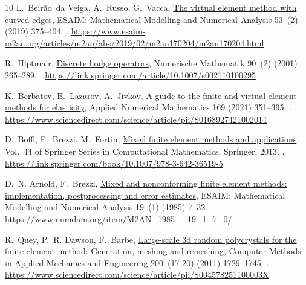 \documentclass{elsarticle}
\theoremstyle{definition}
\begin{document}
\begin{thebibliography}{10}
L.~Beir{\~a}o~da Veiga, A.~Russo, G.~Vacca,
  \href{https://www.esaim-m2an.org/articles/m2an/abs/2019/02/m2an170204/m2an170204.html}{The
  virtual element method with curved edges}, ESAIM: Mathematical Modelling and
  Numerical Analysis 53~(2) (2019) 375--404.
\newblock \href {https://doi.org/10.1051/m2an/2018052}
  {}.
\newline\urlprefix\url{https://www.esaim-m2an.org/articles/m2an/abs/2019/02/m2an170204/m2an170204.html}

R.~Hiptmair,
  \href{https://link.springer.com/article/10.1007/s002110100295}{Discrete hodge
  operators}, Numerische Mathematik 90~(2) (2001) 265--289.
\newblock \href {https://doi.org/10.1007/s002110100295}
  {}.
\newline\urlprefix\url{https://link.springer.com/article/10.1007/s002110100295}

K.~Berbatov, B.~Lazarov, A.~Jivkov,
  \href{https://www.sciencedirect.com/science/article/pii/S0168927421002014}{A
  guide to the finite and virtual element methods for elasticity}, Applied
  Numerical Mathematics 169 (2021) 351--395.
\newblock \href {https://doi.org/https://doi.org/10.1016/j.apnum.2021.07.010}
  {}.
\newline\urlprefix\url{https://www.sciencedirect.com/science/article/pii/S0168927421002014}

D.~Boffi, F.~Brezzi, M.~Fortin,
  \href{https://link.springer.com/book/10.1007/978-3-642-36519-5}{Mixed finite
  element methods and applications}, Vol.~44 of Springer Series in
  Computational Mathematics, Springer, 2013.
\newblock \href {https://doi.org/10.1007/978-3-642-36519-5}
  {}.
\newline\urlprefix\url{https://link.springer.com/book/10.1007/978-3-642-36519-5}

D.~N. Arnold, F.~Brezzi,
  \href{https://www.numdam.org/item/M2AN_1985__19_1_7_0/}{Mixed and
  nonconforming finite element methods: implementation, postprocessing and
  error estimates}, ESAIM: Mathematical Modelling and Numerical Analysis 19~(1)
  (1985) 7--32.
\newline\urlprefix\url{https://www.numdam.org/item/M2AN_1985__19_1_7_0/}

R.~Quey, P.~R. Dawson, F.~Barbe,
  \href{https://www.sciencedirect.com/science/article/pii/S004578251100003X}{Large-scale
  3d random polycrystals for the finite element method: Generation, meshing and
  remeshing}, Computer Methods in Applied Mechanics and Engineering 200~(17-20)
  (2011) 1729--1745.
\newblock \href {https://doi.org/10.1016/j.cma.2011.01.002}
  {}.
\newline\urlprefix\url{https://www.sciencedirect.com/science/article/pii/S004578251100003X}

\end{thebibliography}
\end{document}

